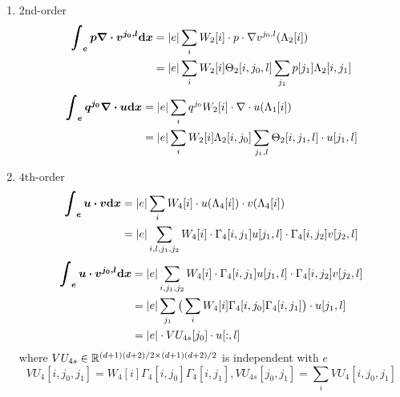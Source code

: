 \begin{enumerate}
  \item $2$nd-order
    \begin{equation}\label{eq:integral-pgv}
      \begin{split}
        \bm{\int_e p\nabla\cdot v^{j_0,l}\mathrm{d} x} &= |e| \sum_i W_2[i]\cdot p\cdot 
        \nabla v^{j_0,l}(\Lambda_2[i]) \\
        &= |e| \sum_iW_2[i]\Theta_2[i,j_0,l]\sum_{j_1}p[j_1]\Lambda_2[i,j_1]
      \end{split}
    \end{equation}
    \begin{equation}\label{eq:integral-qgu}
      \begin{split}
        \bm{\int_e q^{j_0}\nabla\cdot u\mathrm{d} x} &= |e| \sum_i q^{j_0}W_2[i]\cdot 
        \nabla \cdot u(\Lambda_1[i]) \\
        &= |e|\sum_{i} W_2[i]\Lambda_2[i,j_0]\sum_{j_1,l}\Theta_2[i,j_1,l]\cdot u[j_1,l]
      \end{split}
    \end{equation}

  \item $4$th-order
    \begin{equation}\label{eq:integral-uv-all}
      \begin{split}
        \bm{\int_e u\cdot v\mathrm{d} x} &= |e| \sum_i W_4[i]
        \cdot u(\Lambda_4[i])\cdot v(\Lambda_4[i]) \\
        &= |e|\sum_{i,l,j_1,j_2}W_4[i]\cdot\Gamma_4[i,j_1]u[j_1,l]
        \cdot \Gamma_4[i,j_2]v[j_2,l]
      \end{split}
    \end{equation}
    \begin{equation}\label{eq:integral-uv}
      \begin{split}
        \bm{\int_e u\cdot v^{j_0,l}\mathrm{d} x} &= |e| \sum_{i,j_1,j_2} W_4[i]
        \cdot\Gamma_4[i,j_1]u[j_1,l]\cdot\Gamma_4[i,j_2]v[j_2,l] \\
        &= |e|\sum_{j_1}\big(\sum_{i} W_4[i]\Gamma_4[i,j_0]\Gamma_4[i,j_1]\big) 
        \cdot u[j_1,l] \\
        &= |e| \cdot VU_{4s}[j_0]\cdot u[:,l]
      \end{split}
    \end{equation}
    where $VU_{4s}\in\mathbb{R}^{(d+1)(d+2)/2\times(d+1)(d+2)/2}$ is independent with $e$
    \[
      VU_4[i,j_0,j_1]=W_4[i]\Gamma_4[i,j_0]\Gamma_4[i,j_1],
      VU_{4s}[j_0,j_1]=\sum_iVU_4[i,j_0,j_1]
    \]
\end{enumerate}
